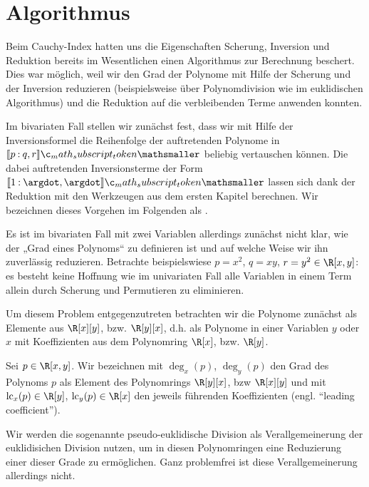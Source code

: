 \documentclass{mythesis}
\begin{document}
\section{Algorithmus}

Beim Cauchy-Index hatten uns die Eigenschaften Scherung, Inversion und Reduktion bereits im Wesentlichen einen Algorithmus zur Berechnung beschert.
Dies war möglich, weil wir den Grad der Polynome mit Hilfe der Scherung und der Inversion reduzieren (beispielsweise über Polynomdivision wie im euklidischen Algorithmus) und die Reduktion auf die verbleibenden Terme anwenden konnten.

Im bivariaten Fall stellen wir zunächst fest, dass wir mit Hilfe der Inversionsformel die Reihenfolge der auftretenden Polynome in $\Index{}{p}{q,r}$ beliebig vertauschen können.
Die dabei auftretenden Inversionsterme der Form $\Index{}{1}{\argdot, \argdot}$ lassen sich dank der Reduktion mit den Werkzeugen aus dem ersten Kapitel berechnen.
Wir bezeichnen dieses Vorgehen im Folgenden als .

Es ist im bivariaten Fall mit zwei Variablen allerdings zunächst nicht klar, wie der „Grad eines Polynoms“ zu definieren ist und auf welche Weise wir ihn zuverlässig reduzieren.
Betrachte beispielswiese $p = x^2$, $q = xy$, $r = y^2 \in \R[x,y]$: es besteht keine Hoffnung wie im univariaten Fall alle Variablen in einem Term allein durch Scherung und Permutieren zu eliminieren.

Um diesem Problem entgegenzutreten betrachten wir die Polynome zunächst als Elemente aus $\R[x][y]$, bzw. $\R[y][x]$, d.h. als Polynome in einer Variablen $y$ oder $x$ mit Koeffizienten aus dem Polynomring $\R[x]$, bzw. $\R[y]$.

\begin{definition}
    Sei $p \in \R[x,y]$.
    Wir bezeichnen mit $\deg_x(p)$, $\deg_y(p)$ den Grad des Polynoms $p$ als Element des Polynomrings $\R[y][x]$, bzw $\R[x][y]$ und mit $\lc_x(p) \in \R[y]$, $\lc_y(p) \in \R[x]$ den jeweils führenden Koeffizienten (engl. “leading coefficient”).
\end{definition}


Wir werden die sogenannte pseudo-euklidische Division als Verallgemeinerung der euklidisichen Division nutzen, um in diesen Polynomringen eine Reduzierung einer dieser Grade zu ermöglichen.
Ganz problemfrei ist diese Verallgemeinerung allerdings nicht.
\end{document}
